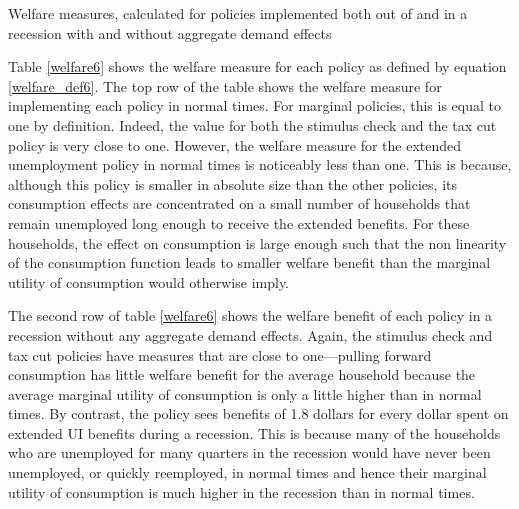 \documentclass[\econtexRoot/HAFiscal]{subfiles}
\begin{document}
\begin{table}[ht] 
	\center
	
	\caption{Welfare measures, calculated for policies implemented both out of and in a recession with and without aggregate demand effects}
	\notinsubfile{\label{welfare6}}
\end{table}

Table \ref{welfare6} shows the welfare measure for each policy as defined by equation \eqref{welfare_def6}.
The top row of the table shows the welfare measure for implementing each policy in normal times.
For marginal policies, this is equal to one by definition.
Indeed, the value for both the stimulus check and the tax cut policy is very close to one.
However, the welfare measure for the extended unemployment policy in normal times is noticeably less than one.
This is because, although this policy is smaller in absolute size than the other policies, its consumption effects are concentrated on a small number of households that remain unemployed long enough to receive the extended benefits.
For these households, the effect on consumption is large enough such that the non linearity of the consumption function leads to smaller welfare benefit than the marginal utility of consumption would otherwise imply.

The second row of table \ref{welfare6} shows the welfare benefit of each policy in a recession without any aggregate demand effects.
Again, the stimulus check and tax cut policies have measures that are close to one---pulling forward consumption has little welfare benefit for the average household because the average marginal utility of consumption is only a little higher than in normal times.
By contrast, the policy sees benefits of 1.8 dollars for every dollar spent on extended UI benefits during a recession.
This is because many of the households who are unemployed for many quarters in the recession would have never been unemployed, or quickly reemployed, in normal times and hence their marginal utility of consumption is much higher in the recession than in normal times.
\end{document}
